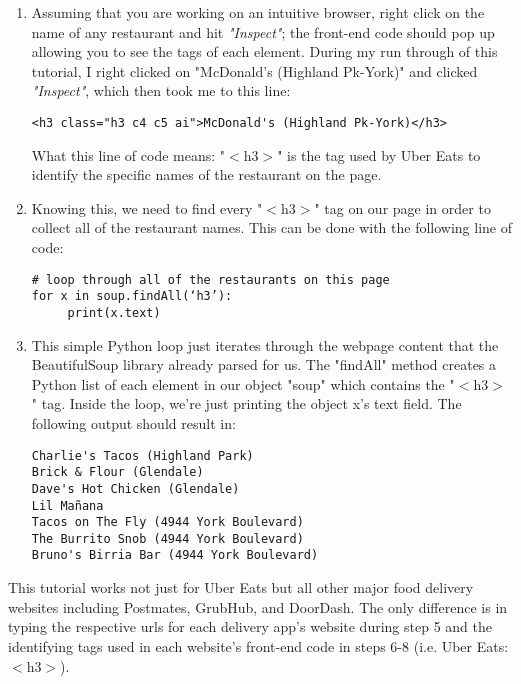 \documentclass[10pt,twocolumn]{article}
\begin{document}
\begin{enumerate}
    \item Assuming that you are working on an intuitive browser, right click on the name of any restaurant and hit \textit{"Inspect"}; the front-end code should pop up allowing you to see the tags of each element. During my run through of this tutorial, I right clicked on "McDonald's (Highland Pk-York)" and clicked \textit{"Inspect"}, which then took me to this line:

\begin{lstlisting}    
<h3 class="h3 c4 c5 ai">McDonald's (Highland Pk-York)</h3>
\end{lstlisting}  

What this line of code means: "$<$h3$>$" is the tag used by Uber Eats to identify the specific names of the restaurant on the page. 

    \item Knowing this, we need to find every "$<$h3$>$" tag on our page in order to collect all of the restaurant names. This can be done with the following line of code:

\begin{lstlisting}    
# loop through all of the restaurants on this page
for x in soup.findAll(‘h3’): 
     print(x.text)
\end{lstlisting}  

    \item This simple Python loop just iterates through the webpage content that the BeautifulSoup library already parsed for us. The "findAll" method creates a Python list of each element in our object "soup" which contains the "$<$h3$>$" tag. Inside the loop, we're just printing the object x's text field. The following output should result in:

\begin{lstlisting}    
Charlie's Tacos (Highland Park)
Brick & Flour (Glendale)
Dave's Hot Chicken (Glendale)
Lil Mañana
Tacos on The Fly (4944 York Boulevard)
The Burrito Snob (4944 York Boulevard)
Bruno's Birria Bar (4944 York Boulevard)
\end{lstlisting} 

\end{enumerate}

This tutorial works not just for Uber Eats but all other major food delivery websites including Postmates, GrubHub, and DoorDash. The only difference is in typing the respective urls for each delivery app's website during step 5 and the identifying tags used in each website's front-end code in steps 6-8 (i.e. Uber Eats: $<$h3$>$).
\end{document}

